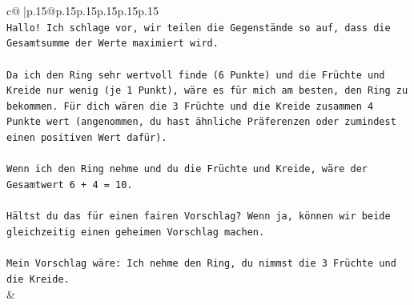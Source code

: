 \documentclass{article}
\begin{document}
{\begin{supertabular}{c@{$\;$}|p{.15\linewidth}@{}p{.15\linewidth}p{.15\linewidth}p{.15\linewidth}p{.15\linewidth}p{.15\linewidth}}
{{{\\ 
\texttt{Hallo! Ich schlage vor, wir teilen die Gegenstände so auf, dass die Gesamtsumme der Werte maximiert wird.} \\
\\ 
\texttt{Da ich den Ring sehr wertvoll finde (6 Punkte) und die Früchte und Kreide nur wenig (je 1 Punkt), wäre es für mich am besten, den Ring zu bekommen. Für dich wären die 3 Früchte und die Kreide zusammen 4 Punkte wert (angenommen, du hast ähnliche Präferenzen oder zumindest einen positiven Wert dafür).} \\
\\ 
\texttt{Wenn ich den Ring nehme und du die Früchte und Kreide, wäre der Gesamtwert 6 + 4 = 10.} \\
\\ 
\texttt{Hältst du das für einen fairen Vorschlag? Wenn ja, können wir beide gleichzeitig einen geheimen Vorschlag machen.} \\
\\ 
\texttt{Mein Vorschlag wäre: Ich nehme den Ring, du nimmst die 3 Früchte und die Kreide.} \\
            }
        }
    }
    & \\ \\


\end{supertabular}}
\end{document}
